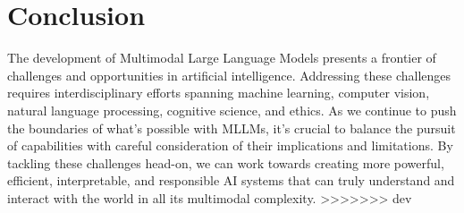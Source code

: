 \section{Conclusion}
The development of Multimodal Large Language Models presents a frontier of challenges and opportunities in artificial intelligence. Addressing these challenges requires interdisciplinary efforts spanning machine learning, computer vision, natural language processing, cognitive science, and ethics. As we continue to push the boundaries of what's possible with MLLMs, it's crucial to balance the pursuit of capabilities with careful consideration of their implications and limitations. By tackling these challenges head-on, we can work towards creating more powerful, efficient, interpretable, and responsible AI systems that can truly understand and interact with the world in all its multimodal complexity.
>>>>>>> dev




